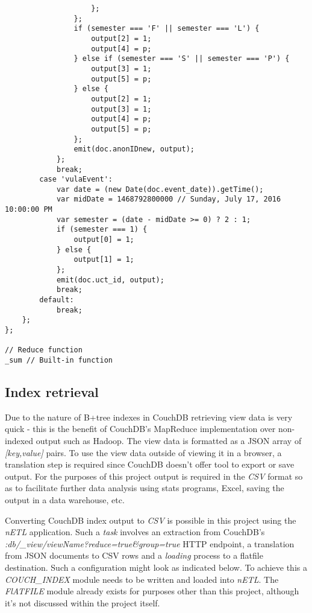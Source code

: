 \begin{verbatim}
                    };
                };
                if (semester === 'F' || semester === 'L') {
                    output[2] = 1;
                    output[4] = p;
                } else if (semester === 'S' || semester === 'P') {
                    output[3] = 1;
                    output[5] = p;
                } else {
                    output[2] = 1;
                    output[3] = 1;
                    output[4] = p;
                    output[5] = p;
                };
                emit(doc.anonIDnew, output);
            };
            break;
        case 'vulaEvent':
            var date = (new Date(doc.event_date)).getTime();
            var midDate = 1468792800000 // Sunday, July 17, 2016 10:00:00 PM
            var semester = (date - midDate >= 0) ? 2 : 1;
            if (semester === 1) {
                output[0] = 1;
            } else {
                output[1] = 1;
            };
            emit(doc.uct_id, output);
            break;
        default:
            break;
    };
};

// Reduce function
_sum // Built-in function
\end{verbatim}

\subsection{Index retrieval}
Due to the nature of B+tree indexes in CouchDB retrieving view data is very quick - this is the benefit of CouchDB's MapReduce implementation over non-indexed output such as Hadoop. The view data is formatted as a JSON array of \textit{[key,value]} pairs. To use the view data outside of viewing it in a browser, a translation step is required since CouchDB doesn't offer tool to export or save output. For the purposes of this project output is required in the \textit{CSV} format so as to facilitate further data analysis using stats programs, Excel, saving the output in a data warehouse, etc.

Converting CouchDB index output to \textit{CSV} is possible in this project using the \textit{nETL} application. Such a \textit{task} involves an extraction from CouchDB's \textit{:db/\_view/viewName?reduce=true\&group=true} HTTP endpoint, a translation from JSON documents to CSV rows and a \textit{loading} process to a flatfile destination. Such a configuration might look as indicated below. To achieve this a \textit{COUCH\_INDEX} module needs to be written and loaded into \textit{nETL}. The \textit{FlATFILE} module already exists for purposes other than this project, although it's not discussed within the project itself.

